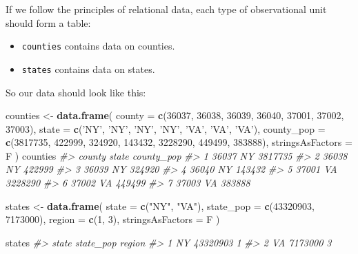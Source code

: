 \documentclass[
]{book}
\newenvironment{Shaded}{\begin{snugshade}}{\end{snugshade}}
\newcommand{\CommentTok}[1]{\textcolor[rgb]{0.56,0.35,0.01}{\textit{#1}}}
\newcommand{\DataTypeTok}[1]{\textcolor[rgb]{0.13,0.29,0.53}{#1}}
\newcommand{\DecValTok}[1]{\textcolor[rgb]{0.00,0.00,0.81}{#1}}
\newcommand{\KeywordTok}[1]{\textcolor[rgb]{0.13,0.29,0.53}{\textbf{#1}}}
\newcommand{\NormalTok}[1]{#1}
\newcommand{\StringTok}[1]{\textcolor[rgb]{0.31,0.60,0.02}{#1}}
\providecommand{\tightlist}{%
  \setlength{\itemsep}{0pt}\setlength{\parskip}{0pt}}
\begin{document}
If we follow the principles of relational data, each type of observational unit should form a table:

\begin{itemize}
\tightlist
\item
  \texttt{counties} contains data on counties.
\item
  \texttt{states} contains data on states.
\end{itemize}

So our data should look like this:

\begin{Shaded}
\begin{Highlighting}[]
\NormalTok{counties <-}\StringTok{ }\KeywordTok{data.frame}\NormalTok{(}
  \DataTypeTok{county =} \KeywordTok{c}\NormalTok{(}\DecValTok{36037}\NormalTok{, }\DecValTok{36038}\NormalTok{, }\DecValTok{36039}\NormalTok{, }\DecValTok{36040}\NormalTok{, }\DecValTok{37001}\NormalTok{, }\DecValTok{37002}\NormalTok{, }\DecValTok{37003}\NormalTok{),}
  \DataTypeTok{state =} \KeywordTok{c}\NormalTok{(}\StringTok{'NY'}\NormalTok{, }\StringTok{'NY'}\NormalTok{, }\StringTok{'NY'}\NormalTok{, }\StringTok{'NY'}\NormalTok{, }\StringTok{'VA'}\NormalTok{, }\StringTok{'VA'}\NormalTok{, }\StringTok{'VA'}\NormalTok{),}
  \DataTypeTok{county_pop =} \KeywordTok{c}\NormalTok{(}\DecValTok{3817735}\NormalTok{, }\DecValTok{422999}\NormalTok{, }\DecValTok{324920}\NormalTok{, }\DecValTok{143432}\NormalTok{, }\DecValTok{3228290}\NormalTok{, }\DecValTok{449499}\NormalTok{, }\DecValTok{383888}\NormalTok{), }\DataTypeTok{stringsAsFactors =}\NormalTok{ F}
\NormalTok{)}
\NormalTok{counties}
\CommentTok{#>   county state county_pop}
\CommentTok{#> 1  36037    NY    3817735}
\CommentTok{#> 2  36038    NY     422999}
\CommentTok{#> 3  36039    NY     324920}
\CommentTok{#> 4  36040    NY     143432}
\CommentTok{#> 5  37001    VA    3228290}
\CommentTok{#> 6  37002    VA     449499}
\CommentTok{#> 7  37003    VA     383888}

\NormalTok{states <-}\StringTok{ }\KeywordTok{data.frame}\NormalTok{(}
  \DataTypeTok{state =} \KeywordTok{c}\NormalTok{(}\StringTok{"NY"}\NormalTok{, }\StringTok{"VA"}\NormalTok{),}
  \DataTypeTok{state_pop =} \KeywordTok{c}\NormalTok{(}\DecValTok{43320903}\NormalTok{, }\DecValTok{7173000}\NormalTok{),}
  \DataTypeTok{region =} \KeywordTok{c}\NormalTok{(}\DecValTok{1}\NormalTok{, }\DecValTok{3}\NormalTok{), }\DataTypeTok{stringsAsFactors =}\NormalTok{ F}
\NormalTok{)}

\NormalTok{states}
\CommentTok{#>   state state_pop region}
\CommentTok{#> 1    NY  43320903      1}
\CommentTok{#> 2    VA   7173000      3}
\end{Highlighting}
\end{Shaded}
\end{document}
